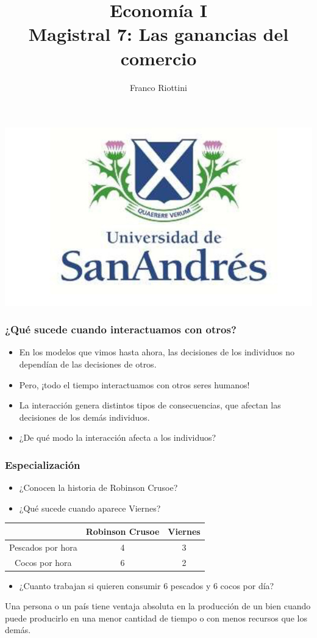 \documentclass{beamer}
\title[Economía I]{Economía I \vspace{4mm}
\\ Magistral 7: Las ganancias del comercio}
\date{}
\author[Riottini]{Franco Riottini}
\institute[]{Universidad de San Andrés}
\begin{document}
\begin{frame}
\titlepage
\centering
\includegraphics[scale=0.2]{../Figures/logoUDESA.jpg} 
\end{frame}


\begin{frame}
\frametitle{¿Qué sucede cuando interactuamos con otros?}
\begin{itemize}
    \item En los modelos que vimos hasta ahora, las decisiones de los individuos no dependían de las decisiones de otros.
    \item Pero, ¡todo el tiempo interactuamos con otros seres humanos!
    \item La interacción genera distintos tipos de consecuencias, que afectan las decisiones de los demás individuos.
    \item ¿De qué modo la interacción afecta a los individuos? 
\end{itemize} 
\end{frame}

\begin{frame}
\frametitle{Especialización}
    \begin{itemize}
        \item ¿Conocen la historia de Robinson Crusoe?
        \item ¿Qué sucede cuando aparece Viernes?  
    \end{itemize}
    \centering \vspace{4mm}
    \begin{tabular}{|c|c|c|} \hline
    & Robinson Crusoe & Viernes \\ \hline
    Pescados por hora   & 4 & 3 \\ \hline
    Cocos por hora   & 6 & 2 \\ \hline     
    \end{tabular}
    \begin{itemize}\vspace{4mm}
        \item ¿Cuanto trabajan si quieren consumir 6 pescados y 6 cocos por día? 
    \end{itemize}
    \begin{boxA}
    \centering
    Una persona o un país tiene ventaja absoluta en la producción de
    un bien cuando puede producirlo en una menor cantidad de
    tiempo o con menos recursos que los demás.
    \end{boxA}
\end{frame}
\end{document}
